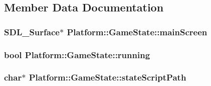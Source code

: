 \subsection{Member Data Documentation}
\hypertarget{class_platform_1_1_game_state_12616fd9e6b9620fb0c8228a35aec98a}{
\subsubsection[{mainScreen}]{\setlength{\rightskip}{0pt plus 5cm}SDL\_\-Surface$\ast$ {\bf Platform::GameState::mainScreen}}}
\label{d4/d4f/class_platform_1_1_game_state_12616fd9e6b9620fb0c8228a35aec98a}


\hypertarget{class_platform_1_1_game_state_2e64c5095158f8a2d03d180d701af768}{
\subsubsection[{running}]{\setlength{\rightskip}{0pt plus 5cm}bool {\bf Platform::GameState::running}}}
\label{d4/d4f/class_platform_1_1_game_state_2e64c5095158f8a2d03d180d701af768}


\hypertarget{class_platform_1_1_game_state_791f4e1dc5c097e707cdca3499fe7ff1}{
\subsubsection[{stateScriptPath}]{\setlength{\rightskip}{0pt plus 5cm}char$\ast$ {\bf Platform::GameState::stateScriptPath}}}
\label{d4/d4f/class_platform_1_1_game_state_791f4e1dc5c097e707cdca3499fe7ff1}


